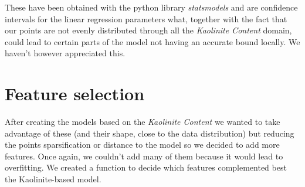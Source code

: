 \documentclass[10pt,conference,compsocconf]{IEEEtran}
\begin{document}
These have been obtained with the python library \textit{statsmodels} and are confidence intervals for the linear regression parameters what, together with the fact that our points are not evenly distributed through all the \textit{Kaolinite Content} domain, could lead to certain parts of the model not having an accurate bound locally. We haven't however appreciated this.





\section{Feature selection}


After creating the models based on the \textit{Kaolinite Content} we wanted to take advantage of these (and their shape, close to the data distribution) but reducing the points sparsification or distance to the model so we decided to add more features. Once again, we couldn't add many of them because it would lead to overfitting. We created a function to decide which features complemented best the Kaolinite-based model.
\end{document}
